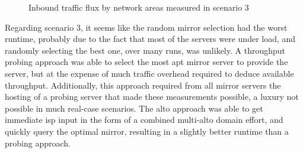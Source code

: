 \begin{figure}[H]
\caption{Inbound traffic flux by network areas measured in scenario 3}
\label{fig:graph-traffic-scenario3}
\end{figure}

    Regarding scenario 3, it seems like the random mirror selection had the worst runtime, probably due to the fact that most of the servers were under load, and randomly selecting the best one, over many runs, was unlikely.
    A throughput probing approach was able to select the most apt mirror server to provide the server, but at the expense of much traffic overhead required to deduce available throughput.
    Additionally, this approach required from all mirror servers the hosting of a probing server that made these measurements possible, a luxury not possible in much real-case scenarios.
    The \gls{alto} approach was able to get immediate \gls{isp} input in the form of a combined multi-\gls{alto} domain effort, and quickly query the optimal mirror, resulting in a slightly better runtime than a probing approach.
